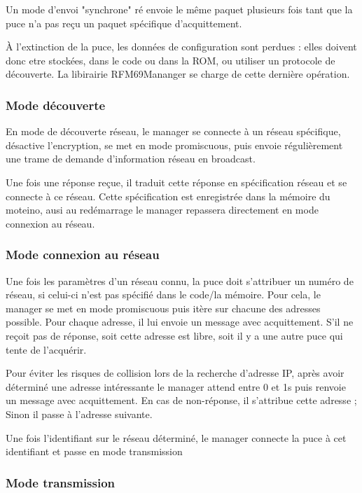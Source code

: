 \documentclass[a4paper]{report}
\begin{document}
Un mode d'envoi "synchrone" ré envoie le même paquet plusieurs fois tant que la puce n'a pas reçu un paquet spécifique d'acquittement.

À l'extinction de la puce, les données de configuration sont perdues : elles doivent donc etre stockées, dans le code ou dans la ROM, ou utiliser un protocole de découverte. La libirairie RFM69Mananger se charge de cette dernière opération.

\subsubsection{Mode découverte}

En mode de découverte réseau, le manager se connecte à un réseau spécifique, désactive l'encryption, se met en mode promiscuous, puis envoie régulièrement une trame de demande d'information réseau en broadcast.

Une fois une réponse reçue, il traduit cette réponse en spécification réseau et se connecte à ce réseau. Cette spécification est enregistrée dans la mémoire du moteino, ausi au redémarrage le manager repassera directement en mode connexion au réseau.

\subsubsection{Mode connexion au réseau}

Une fois les paramètres d'un réseau connu, la puce doit s'attribuer un numéro de réseau, si celui-ci n'est pas spécifié dans le code/la mémoire. Pour cela, le manager se met en mode promiscuous puis itère sur chacune des adresses possible. Pour chaque adresse, il lui envoie un message avec acquittement. S'il ne reçoit pas de réponse, soit cette adresse est libre, soit il y a une autre puce qui tente de l'acquérir.

Pour éviter les risques de collision lors de la recherche d'adresse IP, après avoir déterminé une adresse intéressante le manager attend entre 0 et 1s puis renvoie un message avec acquittement. En cas de non-réponse, il s'attribue cette adresse ; Sinon il passe à l'adresse suivante.

Une fois l'identifiant sur le réseau déterminé,  le manager connecte la puce à cet identifiant et passe en mode transmission

\subsubsection{Mode transmission}
\end{document}
